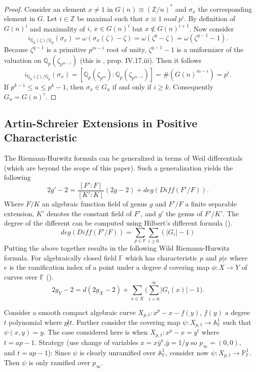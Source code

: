 \documentclass[paper=a4, fontsize=11pt]{scrartcl} %
\numberwithin{equation}{section} %
\numberwithin{figure}{section} %
\numberwithin{table}{section} %
\theoremstyle{break}
\begin{document}
\begin{proof}
Consider an element $x\not=1$ in $G(n)\cong (\mathbb{Z}/n)^*$ and $\sigma_x$ the corresponding element in $G$. Let $i\in\mathbb{Z}$ be maximal such that $x \equiv 1 \; mod\;p^i$. By definition of $G(n)^i$ and maximality of $i$, $x\in G(n)^i$ but $x\not\in G(n)^{i+1}$. Now consider
$$
i_{\mathbb{Q}_p(\zeta)/\mathbb{Q}_p}(\sigma_x) = \omega(\sigma_x(\zeta)-\zeta) = \omega(\zeta^q-\zeta)=\omega(\zeta^{q-1}-1).
$$
Because $\zeta^{q-1}$ is a primitive $p^{m-i}$ root of unity, $\zeta^{q-1}-1$ is a uniformizer of the valuation on $\mathbb{Q}_p(\zeta_{p^{m-i}})$ (this is \cite{Serre}, prop. IV.17.iii). Then it follows
$$
i_{\mathbb{Q}_p(\zeta)/\mathbb{Q}_p}(\sigma_x) = [\mathbb{Q}_p(\zeta_{p^{m}}):\mathbb{Q}_p(\zeta_{p^{m-i}})]=\#(G(n)^{m-i})=p^i.
$$
If $p^{k-1} \leq u \leq p^k -1$, then $\sigma_x\in G_u$ if and only if $i\geq k$. Consequently $G_u = G(n)^i$.
\end{proof}

\subsection{Artin-Schreier Extensions in Positive Characteristic}
The Riemann-Hurwitz formula can be generalized in terms of Weil differentials (which are beyond the scope of this paper). Such a generalization yields the following
$$
2g'-2=\frac{[F':F]}{[K':K]}(2g-2) + deg(Diff(F'/F)).
$$
Where $F/K$ an algebraic function field of genus $g$ and $F'/F$ a finite separable extension, $K'$ denotes the constant field of $F'$, and $g'$ the genus of $F'/K'$. The degree of the different can be computed using Hilbert's different formula  (\cite{stitchenoth}).
$$
deg(Diff(F'/F)) = \sum_{p\in\mathbb{P}}\sum_{i\geq 0}(|G_i| -1)
$$
Putting the above together results in the following Wild Riemann-Hurwitz formula. For algebraically closed field $\mathbb{F}$ which has characteristic $p$ and $p|e$ where $e$ is the ramification index of a point under a degree $d$ covering map $\phi:X \to Y$ of curves over $\mathbb{F}$ (\cite{RnR}). 
$$
2g_Y -2 = d(2g_X -2) + \sum_{x\in X} \big( \sum^{\infty}_{i=0}|G_i(x)| -1 \big).
$$

Consider a smooth compact algebraic curve $X_{p,t}: x^p - x - f(y)$, $f(y)$ a degree $t$ polynomial where $p\not|t$. Further consider the covering map $\psi: X_{p,t} \to \mathbb{A}^1_\mathbb{F}$ such that $\psi(x,y)=y$. 
The case considered here is when $X_{p,t}: x^p-x = y^t$ where $t=ap-1$.
Strategy (use change of variables $x=x\bar{y}^a$,$\bar{y}=1/y$ so $p_\infty = (0,0)$, and $t=ap-1$):
Since $\psi$ is clearly unramified over $\mathbb{A}^1_\mathbb{F}$, consider now $\psi: X_{p,t} \to \mathbb{P}^1_\mathbb{F}$. Then $\psi$ is only ramified over $p_\infty$. 
\end{document}
